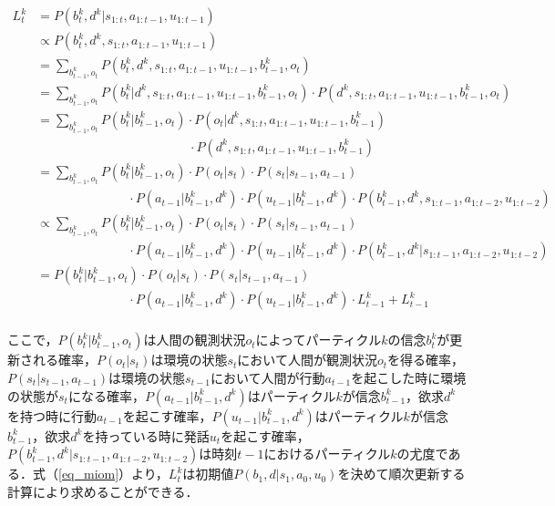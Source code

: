 \begin{equation}
  \begin{split}
  \label{eq_miom}
  L^k_t&=P(b_t^k,d^k|s_{1:t},a_{1:t-1},u_{1:t-1})\\
  &\propto P(b_t^k,d^k,s_{1:t},a_{1:t-1},u_{1:t-1})\\
  &= \sum_{b_{t-1}^k,o_t}P(b_t^k,d^k,s_{1:t},a_{1:t-1},u_{1:t-1},b_{t-1}^k,o_t)\\
  &= \sum_{b_{t-1}^k,o_t}P(b_t^k|d^k,s_{1:t},a_{1:t-1},u_{1:t-1},b_{t-1}^k,o_t)\cdot P(d^k,s_{1:t},a_{1:t-1},u_{1:t-1},b_{t-1}^k,o_t)\\
  &= \sum_{b_{t-1}^k,o_t}P(b_t^k|b_{t-1}^k,o_t)\cdot P(o_t|d^k,s_{1:t},a_{1:t-1},u_{1:t-1},b_{t-1}^k)\\
  &\hspace{5cm} \cdot P(d^k,s_{1:t},a_{1:t-1},u_{1:t-1},b_{t-1}^k)\\
  &= \sum_{b_{t-1}^k,o_t}P(b_t^k|b_{t-1}^k,o_t)\cdot P(o_t|s_t)\cdot P(s_t|s_{t-1},a_{t-1})\\
  &\hspace{3cm} \cdot P(a_{t-1}|b_{t-1}^k,d^k)\cdot P(u_{t-1}|b_{t-1}^k,d^k)\cdot P(b_{t-1}^k,d^k,s_{1:t-1},a_{1:t-2},u_{1:t-2})\\
  &\propto \sum_{b_{t-1}^k,o_t}P(b_t^k|b_{t-1}^k,o_t)\cdot P(o_t|s_t)\cdot P(s_t|s_{t-1},a_{t-1})\\
  &\hspace{3cm} \cdot P(a_{t-1}|b_{t-1}^k,d^k)\cdot P(u_{t-1}|b_{t-1}^k,d^k)\cdot P(b_{t-1}^k,d^k|s_{1:t-1},a_{1:t-2},u_{1:t-2})\\
  &= P(b_t^k|b_{t-1}^k,o_t)\cdot P(o_t|s_t)\cdot P(s_t|s_{t-1},a_{t-1})\\
  &\hspace{3cm} \cdot P(a_{t-1}|b_{t-1}^k,d^k)\cdot P(u_{t-1}|b_{t-1}^k,d^k)\cdot L^k_{t-1}+L^k_{t-1}\\
  \end{split}
\end{equation}

ここで，$P(b_t^k|b_{t-1}^k,o_t)$は人間の観測状況$o_t$によってパーティクル$k$の信念$b_t^k$が更新される確率，$P(o_t|s_t)$は環境の状態$s_t$において人間が観測状況$o_t$を得る確率，$P(s_t|s_{t-1},a_{t-1})$は環境の状態$s_{t-1}$において人間が行動$a_{t-1}$を起こした時に環境の状態が$s_{t}$になる確率，$P(a_{t-1}|b_{t-1}^k,d^k)$はパーティクル$k$が信念$b_{t-1}^k$，欲求$d^k$を持つ時に行動$a_{t-1}$を起こす確率，$P(u_{t-1}|b_{t-1}^k,d^k)$はパーティクル$k$が信念$b_{t-1}^k$，欲求$d^k$を持っている時に発話$u_t$を起こす確率，$P(b_{t-1}^k,d^k|s_{1:t-1},a_{1:t-2},u_{1:t-2})$は時刻$t-1$におけるパーティクル$k$の尤度である．式（\ref{eq_miom}）より，$L^k_t$は初期値$P(b_1,d|s_1,a_0,u_0)$を決めて順次更新する計算により求めることができる．

